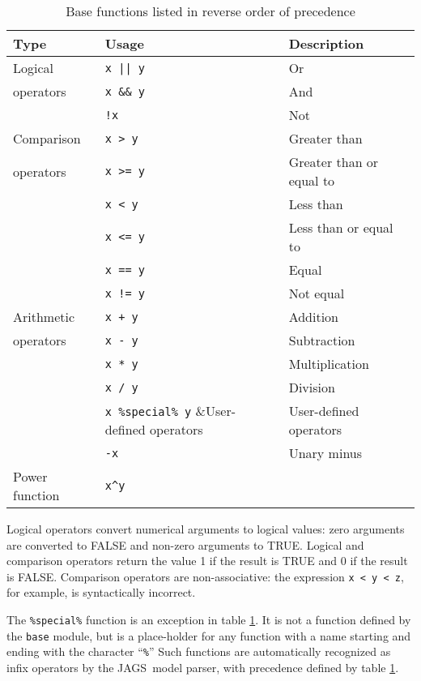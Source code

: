 \documentclass[11pt, a4paper, titlepage]{report}
\newcommand{\JAGS}{\textsf{JAGS}}
\begin{document}
\begin{table}[h]
\begin{center}
\begin{tabular}{lll}
\hline
Type & Usage & Description\\ 
\hline
Logical           & \verb+x || y+ & Or \\
operators         & \verb+x && y+ & And \\
                  & \verb+!x+     & Not \\
\hline
Comparison  & \verb+x > y+ & Greater than\\
operators   & \verb+x >= y+ & Greater than or equal to  \\
            & \verb+x < y+ & Less than \\
            & \verb+x <= y+ & Less than or equal to \\
            & \verb+x == y+ & Equal \\
            & \verb+x != y+ & Not equal \\
\hline
Arithmetic  & \verb-x + y- & Addition \\
operators   & \verb+x - y+ & Subtraction\\
            & \verb+x * y+ & Multiplication \\
            & \verb+x / y+ & Division \\
            & \verb+x %special% y+ &User-defined operators\\
            & \verb+-x+ & Unary minus\\
\hline
Power function & \verb+x^y+ & \\
\hline
\end{tabular}
\caption{Base functions listed in reverse order of precedence 
  \label{table:base:functions}}
\end{center}
\end{table}

Logical operators convert numerical arguments to logical values: zero
arguments are converted to FALSE and non-zero arguments to
TRUE. Logical and comparison operators return the value 1 if the
result is TRUE and 0 if the result is FALSE.  Comparison operators are
non-associative: the expression \verb+x < y < z+, for example, is
syntactically incorrect.

The \verb+%special%+ function is an exception in table
\ref{table:base:functions}. It is not a function defined by the
\verb+base+ module, but is a place-holder for any function
with a name starting and ending with the character ``\verb+%+'' Such
functions are automatically recognized as infix operators by the
\JAGS\ model parser, with precedence defined by table
\ref{table:base:functions}.
\end{document}
